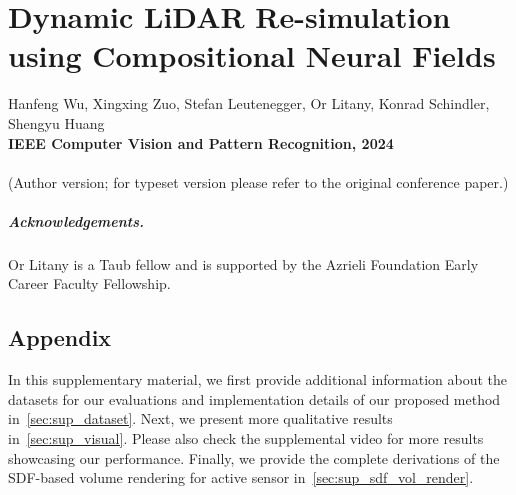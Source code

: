 \chapter[Dynamic LiDAR Re-simulation using Compositional Neural Fields]{Dynamic LiDAR Re-simulation using Compositional Neural Fields}
\label{chap:cvpr24}

Hanfeng Wu, Xingxing Zuo, Stefan Leutenegger, Or Litany, Konrad Schindler, Shengyu Huang \\
\textbf{IEEE Computer Vision and Pattern Recognition, 2024}\\
\\
(Author version; for typeset version please refer to the original conference paper.)\\

\providecommand{\subdir}{.}
\graphicspath{{\subdir/}}


\newpage









\paragraph{Acknowledgements.}
{Or Litany is a Taub fellow and is supported by the Azrieli Foundation Early Career Faculty Fellowship.}

\clearpage
\section{Appendix}
In this supplementary material, we first provide additional information about the datasets for our evaluations and implementation details of our proposed method in~\cref{sec:sup_dataset}. Next, we present more qualitative results in~\cref{sec:sup_visual}. Please also check the supplemental video for more results showcasing our performance. Finally, we provide the complete derivations of the SDF-based volume rendering for active sensor in~\cref{sec:sup_sdf_vol_render}. 



\clearpage
